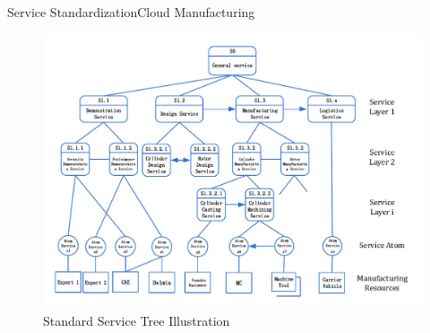 \begin{frame}{Service Standardization}{Cloud Manufacturing}
\begin{figure}
\centering
\includegraphics[height=0.85\textheight]{figures/boss.pdf}
\caption{Standard Service Tree Illustration}
\end{figure}

\end{frame}

